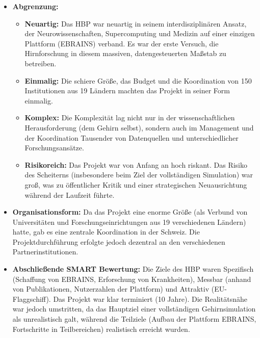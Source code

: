 \documentclass{article}
\begin{document}
\begin{itemize}
    \item \textbf{Abgrenzung:}
    \begin{itemize}
        \item \textbf{Neuartig:} Das HBP war neuartig in seinem interdisziplinären Ansatz, der Neurowissenschaften, 
        Supercomputing und Medizin auf einer einzigen Plattform (EBRAINS) verband. 
        Es war der erste Versuch, die Hirnforschung in diesem massiven, datengesteuerten Maßstab zu betreiben.
        \item \textbf{Einmalig:} Die schiere Größe, das Budget und die Koordination von 150 Institutionen aus 19 Ländern machten das Projekt in seiner Form einmalig.
        \item \textbf{Komplex:} Die Komplexität lag nicht nur in der wissenschaftlichen Herausforderung (dem Gehirn selbst), 
        sondern auch im Management und der Koordination Tausender von Datenquellen und unterschiedlicher Forschungsansätze.
        \item \textbf{Risikoreich:} Das Projekt war von Anfang an hoch riskant. Das Risiko des Scheiterns (insbesondere beim Ziel der vollständigen Simulation) war groß, 
        was zu öffentlicher Kritik und einer strategischen Neuausrichtung während der Laufzeit führte.
    \end{itemize}

    \item \textbf{Organisationsform:}
    Da das Projekt eine enorme Größe (als Verbund von Universitäten und Forschungseinrichtungen aus 19 verschiedenen Ländern) hatte, gab es eine zentrale 
    Koordination in der Schweiz. Die Projektdurchführung erfolgte jedoch dezentral an den verschiedenen Partnerinstitutionen.

    \item \textbf{Abschließende SMART Bewertung:}
    Die Ziele des HBP waren Spezifisch (Schaffung von EBRAINS, Erforschung von Krankheiten), 
    Messbar (anhand von Publikationen, Nutzerzahlen der Plattform) und Attraktiv (EU-Flaggschiff). 
    Das Projekt war klar terminiert (10 Jahre). 
    Die Realitätsnähe war jedoch umstritten, da das Hauptziel einer vollständigen Gehirnsimulation als unrealistisch galt, 
    während die Teilziele (Aufbau der Plattform EBRAINS, Fortschritte in Teilbereichen) realistisch erreicht wurden.

\end{itemize}
\clearpage



\end{document}
